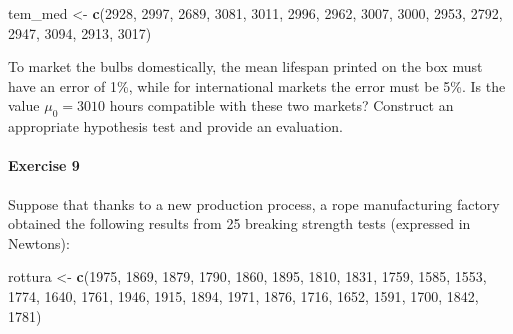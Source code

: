 \documentclass[
]{article}
\newenvironment{Shaded}{\begin{snugshade}}{\end{snugshade}}
\newcommand{\DecValTok}[1]{\textcolor[rgb]{0.00,0.00,0.81}{#1}}
\newcommand{\FunctionTok}[1]{\textcolor[rgb]{0.13,0.29,0.53}{\textbf{#1}}}
\newcommand{\NormalTok}[1]{#1}
\newcommand{\OtherTok}[1]{\textcolor[rgb]{0.56,0.35,0.01}{#1}}
\begin{document}
\begin{Shaded}
\begin{Highlighting}[]
\NormalTok{tem\_med }\OtherTok{\textless{}{-}} \FunctionTok{c}\NormalTok{(}\DecValTok{2928}\NormalTok{, }\DecValTok{2997}\NormalTok{, }\DecValTok{2689}\NormalTok{, }\DecValTok{3081}\NormalTok{, }\DecValTok{3011}\NormalTok{, }\DecValTok{2996}\NormalTok{, }\DecValTok{2962}\NormalTok{, }\DecValTok{3007}\NormalTok{, }\DecValTok{3000}\NormalTok{, }\DecValTok{2953}\NormalTok{, }\DecValTok{2792}\NormalTok{, }\DecValTok{2947}\NormalTok{, }\DecValTok{3094}\NormalTok{, }\DecValTok{2913}\NormalTok{, }\DecValTok{3017}\NormalTok{)}
\end{Highlighting}
\end{Shaded}

To market the bulbs domestically, the mean lifespan printed on the box
must have an error of 1\%, while for international markets the error
must be 5\%. Is the value \(\mu_0 = 3010\) hours compatible with these
two markets? Construct an appropriate hypothesis test and provide an
evaluation.

\hypertarget{exercise-9}{%
\paragraph{Exercise 9}\label{exercise-9}}

Suppose that thanks to a new production process, a rope manufacturing
factory obtained the following results from 25 breaking strength tests
(expressed in Newtons):

\begin{Shaded}
\begin{Highlighting}[]
\NormalTok{rottura }\OtherTok{\textless{}{-}} \FunctionTok{c}\NormalTok{(}\DecValTok{1975}\NormalTok{, }\DecValTok{1869}\NormalTok{, }\DecValTok{1879}\NormalTok{, }\DecValTok{1790}\NormalTok{, }\DecValTok{1860}\NormalTok{, }\DecValTok{1895}\NormalTok{, }\DecValTok{1810}\NormalTok{, }\DecValTok{1831}\NormalTok{, }\DecValTok{1759}\NormalTok{, }\DecValTok{1585}\NormalTok{, }\DecValTok{1553}\NormalTok{, }\DecValTok{1774}\NormalTok{, }\DecValTok{1640}\NormalTok{, }\DecValTok{1761}\NormalTok{, }\DecValTok{1946}\NormalTok{, }\DecValTok{1915}\NormalTok{, }\DecValTok{1894}\NormalTok{, }\DecValTok{1971}\NormalTok{, }\DecValTok{1876}\NormalTok{, }\DecValTok{1716}\NormalTok{, }\DecValTok{1652}\NormalTok{, }\DecValTok{1591}\NormalTok{, }\DecValTok{1700}\NormalTok{, }\DecValTok{1842}\NormalTok{, }\DecValTok{1781}\NormalTok{)}
\end{Highlighting}
\end{Shaded}
\end{document}
